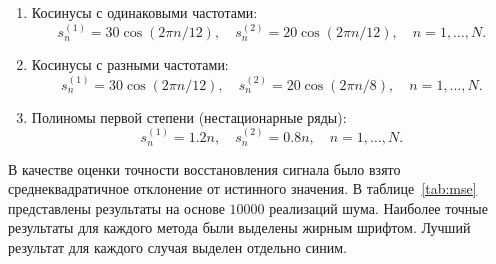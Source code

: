 \documentclass[specialist,
substylefile = spbu_report.rtx,
subf,href,colorlinks=true, 12pt]{disser}
\theoremstyle{definition}
\begin{document}
\begin{enumerate}
	\item Косинусы с одинаковыми частотами:
	      \[
		      s_n^{(1)}=30\cos(2\pi n/12),\quad s_n^{(2)}=20\cos(2\pi n/12),\quad n=1,\ldots, N.
	      \]
	\item Косинусы с разными частотами:
	      \[
		      s_n^{(1)}=30\cos(2\pi n/12),\quad s_n^{(2)}=20\cos(2\pi n/8),\quad n=1,\ldots, N.
	      \]
	\item Полиномы первой степени (нестационарные ряды):
	      \[
		      s_n^{(1)}=1.2n,\quad s_n^{(2)}=0.8n,\quad n=1,\ldots,N.
	      \]
\end{enumerate}
В качестве оценки точности восстановления сигнала было взято среднеквадратичное отклонение от истинного значения. В таблице~\ref{tab:mse} представлены результаты на основе $10000$ реализаций шума. Наиболее точные результаты для каждого метода были выделены жирным шрифтом. Лучший результат для каждого случая выделен отдельно синим.
\end{document}
